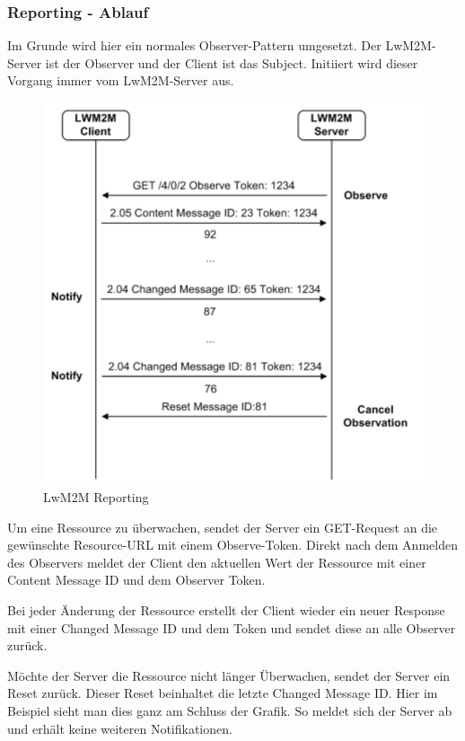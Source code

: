 \subsubsection{Reporting - Ablauf}
Im Grunde wird hier ein normales Observer-Pattern umgesetzt. Der LwM2M-Server ist der Observer und der Client ist das Subject. Initiiert wird dieser Vorgang immer vom LwM2M-Server aus. 
\begin{figure}[H]
\includegraphics[scale=0.4]{../02_Analyse/images/lwm2m/report_diagram.png}
\caption{LwM2M Reporting\cite{LwM2MInterfaces}}
\end{figure}
Um eine Ressource zu überwachen, sendet der Server ein GET-Request an die gewünschte Resource-URL mit einem Observe-Token. Direkt nach dem Anmelden des Observers meldet der Client den aktuellen Wert der Ressource mit einer Content Message ID und dem Observer Token.

Bei jeder Änderung der Ressource erstellt der Client wieder ein neuer Response mit einer Changed Message ID und dem Token und sendet diese an alle Observer zurück.

Möchte der Server die Ressource nicht länger Überwachen, sendet der Server ein Reset zurück. Dieser Reset beinhaltet die letzte Changed Message ID. Hier im Beispiel sieht man dies ganz am Schluss der Grafik. So meldet sich der Server ab und erhält keine weiteren Notifikationen.

